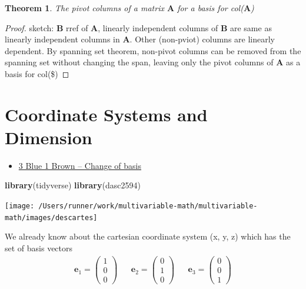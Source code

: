 \documentclass[
]{book}
\newenvironment{Shaded}{\begin{snugshade}}{\end{snugshade}}
\newcommand{\KeywordTok}[1]{\textcolor[rgb]{0.13,0.29,0.53}{\textbf{#1}}}
\newcommand{\NormalTok}[1]{#1}
\providecommand{\tightlist}{%
  \setlength{\itemsep}{0pt}\setlength{\parskip}{0pt}}
\newtheorem{theorem}{Theorem}[chapter]
\theoremstyle{definition}
\theoremstyle{definition}
\theoremstyle{definition}
\theoremstyle{definition}
\theoremstyle{remark}
\begin{document}
\begin{theorem}
The pivot columns of a matrix \(\mathbf{A}\) for a basis for col(\(\mathbf{A}\))
\end{theorem}

\begin{proof}
sketch: \(\mathbf{B}\) rref of \(\mathbf{A}\), linearly independent columns of \(\mathbf{B}\) are same as linearly independent columns in \(\mathbf{A}\). Other (non-pviot) columns are linearly dependent. By spanning set theorem, non-pivot columns can be removed from the spanning set without changing the span, leaving only the pivot columns of \(\mathbf{A}\) as a basis for col(\$)
\end{proof}

\hypertarget{coordinate-systems-and-dimension}{%
\chapter{Coordinate Systems and Dimension}\label{coordinate-systems-and-dimension}}

\begin{itemize}
\tightlist
\item
  \href{https://www.3blue1brown.com/lessons/change-of-basis}{3 Blue 1 Brown -- Change of basis}
\end{itemize}

\newcommand{\basis}{{\mathcal{B} = \{ \mathbf{b}_1, \ldots, \mathbf{b}_n \}}}
\newcommand{\V}{{\mathcal{V}}}

\begin{Shaded}
\begin{Highlighting}[]
\KeywordTok{library}\NormalTok{(tidyverse)}
\KeywordTok{library}\NormalTok{(dasc2594)}
\end{Highlighting}
\end{Shaded}

\texttt{[image: /Users/runner/work/multivariable-math/multivariable-math/images/descartes]}

We already know about the cartesian coordinate system (x, y, z) which has the set of basis vectors
\[
\begin{aligned}
\mathbf{e}_1 = \begin{pmatrix} 1 \\ 0 \\ 0 \end{pmatrix} && 
\mathbf{e}_2 = \begin{pmatrix} 0 \\ 1 \\ 0 \end{pmatrix} && 
\mathbf{e}_3 = \begin{pmatrix} 0 \\ 0 \\ 1 \end{pmatrix} 
\end{aligned}
\]
\end{document}
